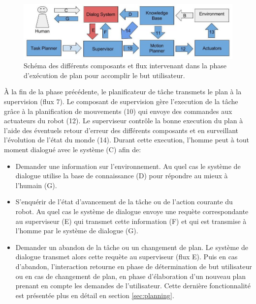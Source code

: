 \documentclass[a4paper,11pt,twoside]{StyleThese}
\begin{document}
\begin{figure}[ht!]
 \centering
  \includegraphics[width=0.99\linewidth]{./img/phase3color.jpg} 
  \caption {Schéma des différents composants et flux intervenant dans la phase d'exécution de plan pour accomplir le but utilisateur.}
  \label{fig:phase3}
\end{figure}

À la fin de la phase précédente, le planificateur de tâche transmets le plan à la supervision (flux 7). Le composant de supervision gère l'execution de la tâche grâce à la planification de mouvements (10) qui envoye des commandes aux actuateurs du robot (12). Le superviseur contrôle la bonne execution du plan à l'aide des éventuels retour d'erreur des différents composants et en surveillant l'évolution de l'état du monde (14). Durant cette execution, l'homme peut à tout moment dialogué avec le système (C) afin de:
\begin{itemize}
\item Demander une information sur l'environnement. Au quel cas le système de dialogue utilise la base de connaissance (D) pour répondre au mieux à l'humain (G).
\item S'enquérir de l'état d'avancement de la tâche ou de l'action courante du robot. Au quel cas le système de dialogue envoye une requète correspondante au superviseur (E) qui transmet cette information (F) et qui est transmise à l'homme par le système de dialogue (G).
\item Demander un abandon de la tâche ou un changement de plan. Le système de dialogue transmet alors cette requète au superviseur (flux E). Puis en cas d'abandon, l'interaction retourne en phase de détermination de but utilisateur ou en cas de changement de plan, en phase d'élaboration d'un nouveau plan prenant en compte les demandes de l'utilisateur. Cette dernière fonctionnalité est présentée plus en détail en section \ref{sec:planning}.
\end{itemize}
\end{document}
